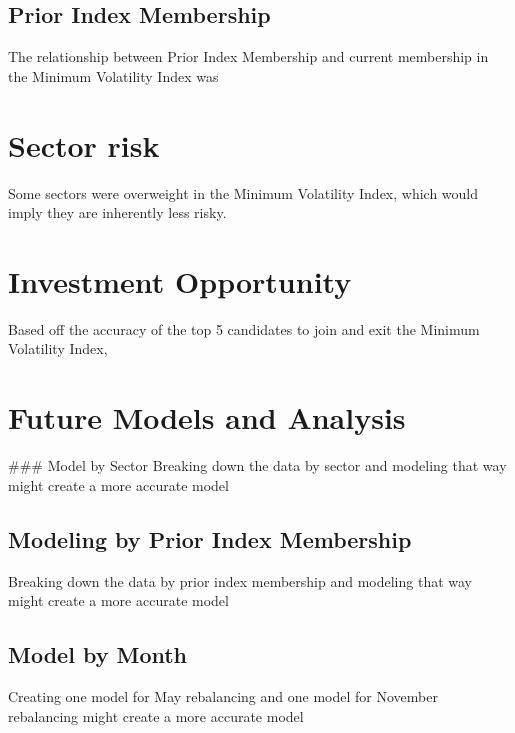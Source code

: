 \documentclass[12pt,twoside]{reedthesis}
\theoremstyle{definition}
\theoremstyle{definition}
\theoremstyle{definition}
\theoremstyle{remark}
\begin{document}
\subsection{Prior Index Membership}\label{prior-index-membership}

The relationship between Prior Index Membership and current membership
in the Minimum Volatility Index was \hfill\break

\section{Sector risk}\label{sector-risk}

Some sectors were overweight in the Minimum Volatility Index, which
would imply they are inherently less risky. \hfill\break

\section{Investment Opportunity}\label{investment-opportunity}

Based off the accuracy of the top 5 candidates to join and exit the
Minimum Volatility Index, \hfill\break

\section{Future Models and Analysis}\label{future-models-and-analysis}

\hfill\break
\#\#\# Model by Sector Breaking down the data by sector and modeling
that way might create a more accurate model \hfill\break

\subsection{Modeling by Prior Index
Membership}\label{modeling-by-prior-index-membership}

Breaking down the data by prior index membership and modeling that way
might create a more accurate model \hfill\break

\subsection{Model by Month}\label{model-by-month}

Creating one model for May rebalancing and one model for November
rebalancing might create a more accurate model\\
\hfill\break
\end{document}
